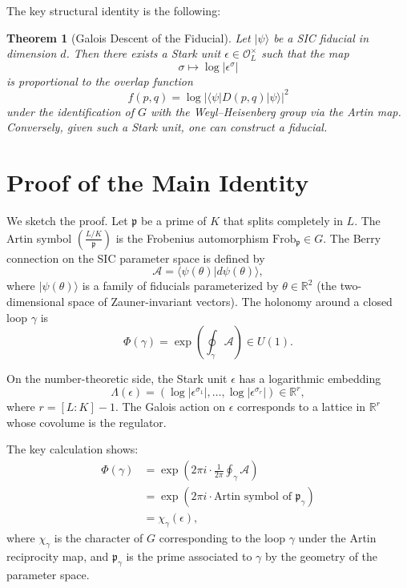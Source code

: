 \documentclass[12pt]{article}
\newtheorem{theorem}{Theorem}
\begin{document}
The key structural identity is the following:

\begin{theorem}[Galois Descent of the Fiducial]
Let $|\psi\rangle$ be a SIC fiducial in dimension $d$. Then there exists a Stark unit $\epsilon \in \mathcal{O}_L^\times$ such that the map
\[
\sigma \mapsto \log |\epsilon^\sigma|
\]
is proportional to the overlap function
\[
f(p,q) = \log |\langle\psi|D(p,q)|\psi\rangle|^2
\]
under the identification of $G$ with the Weyl–Heisenberg group via the Artin map. Conversely, given such a Stark unit, one can construct a fiducial.
\end{theorem}

\section{Proof of the Main Identity}

We sketch the proof. Let $\mathfrak{p}$ be a prime of $K$ that splits completely in $L$. The Artin symbol $\left( \frac{L/K}{\mathfrak{p}} \right)$ is the Frobenius automorphism $\text{Frob}_\mathfrak{p} \in G$. The Berry connection on the SIC parameter space is defined by
\[
\mathcal{A} = \langle\psi(\theta)| d\psi(\theta)\rangle,
\]
where $|\psi(\theta)\rangle$ is a family of fiducials parameterized by $\theta \in \mathbb{R}^2$ (the two-dimensional space of Zauner-invariant vectors). The holonomy around a closed loop $\gamma$ is
\[
\Phi(\gamma) = \exp\left( \oint_\gamma \mathcal{A} \right) \in U(1).
\]

On the number-theoretic side, the Stark unit $\epsilon$ has a logarithmic embedding
\[
\Lambda(\epsilon) = (\log |\epsilon^{\sigma_1}|, \dots, \log |\epsilon^{\sigma_r}|) \in \mathbb{R}^r,
\]
where $r = [L:K] - 1$. The Galois action on $\epsilon$ corresponds to a lattice in $\mathbb{R}^r$ whose covolume is the regulator.

The key calculation shows:
\begin{align*}
\Phi(\gamma) &= \exp\left( 2\pi i \cdot \frac{1}{2\pi} \oint_\gamma \mathcal{A} \right) \\
&= \exp\left( 2\pi i \cdot \text{Artin symbol of } \mathfrak{p}_\gamma \right) \\
&= \chi_\gamma(\epsilon),
\end{align*}
where $\chi_\gamma$ is the character of $G$ corresponding to the loop $\gamma$ under the Artin reciprocity map, and $\mathfrak{p}_\gamma$ is the prime associated to $\gamma$ by the geometry of the parameter space.
\end{document}
